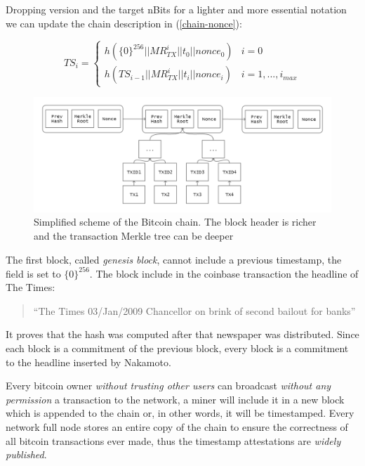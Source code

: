 Dropping version and the target nBits for a lighter and more essential notation we can update the chain description in (\ref{chain-nonce}):

\begin{equation}
TS_i =  
\begin{cases} 
h(\{0\}^{256}||MR_{TX}^i||t_0||nonce_0) & i=0\\ 
h(TS_{i-1}||MR_{TX}^i||t_i||nonce_i) & i=1, ..., i_{max} 
\end{cases}
\end{equation}

\begin{figure}
	\begin{center}
		\includegraphics[width=\linewidth]{Images/bitcoin-chain-tx.png}
		\caption[Simplified scheme of the Bitcoin chain.]{Simplified scheme of the Bitcoin chain. The block header is richer and the transaction Merkle tree can be deeper}
		\label{fig:tx-chain}
	\end{center}
\end{figure}

The first block, called \textit{genesis block}, cannot include a previous timestamp, the field is set to $\{0\}^{256}$. The block include in the coinbase transaction the headline of The Times:
\begin{quotation}
\textquotedblleft The Times 03/Jan/2009 Chancellor on brink of second bailout for banks\textquotedblright 
\end{quotation}
It proves that the hash was computed after that newspaper was distributed. 
Since each block is a commitment of the previous block, every block is a commitment to the headline inserted by Nakamoto.

Every bitcoin owner \textit{without trusting other users} can broadcast \textit{without any permission} a transaction to the network, a miner will include it in a new block which is appended to the chain or, in other words, it will be timestamped. Every network full node stores an entire copy of the chain to ensure the correctness of all bitcoin transactions ever made, thus the timestamp attestations are \textit{widely published}.  

